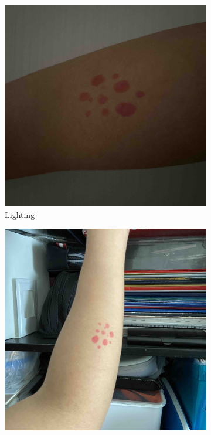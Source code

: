 \begin{figure}[ht]
\begin{subfigure}[b]{0.24\textwidth}
        \includegraphics[width=\textwidth]{img/Lighting.jpg}
        \caption{Lighting}
        \label{fig:lighting}
    \end{subfigure}
    \hfill
    \begin{subfigure}[b]{0.24\textwidth}
        \includegraphics[width=\textwidth]{img/Background.jpg}

\end{subfigure}
\end{figure}
